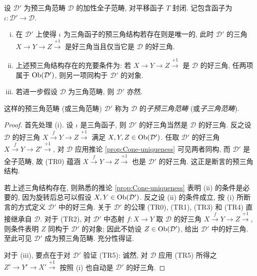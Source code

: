 \begin{definition-proposition}[子预三角范畴]\label{def:triangulated-subcat}
	设 $\mathcal{D}'$ 为预三角范畴 $\mathcal{D}$ 的加性全子范畴, 对平移函子 $T$ 封闭. 记包含函子为 $\iota: \mathcal{D}' \to \mathcal{D}$.
	\begin{enumerate}[(i)]
		\item 在 $\mathcal{D}'$ 上使得 $\iota$ 为三角函子的预三角结构若存在则是唯一的, 此时 $\mathcal{D}'$ 的三角 $X \to Y \to Z \xrightarrow{+1}$ 是好三角当且仅当它是 $\mathcal{D}$ 的好三角.
		\item 上述预三角结构存在的充要条件为: 若 $X \to Y \to Z \xrightarrow{+1}$ 是 $\mathcal{D}$ 的好三角, 任两项属于 $\operatorname{Ob}(\mathcal{D}')$, 则另一项同构于 $\mathcal{D}'$ 的对象.
		\item 若进一步假设 $\mathcal{D}$ 为三角范畴, 则 $\mathcal{D}'$ 亦然.
	\end{enumerate}

	这样的预三角范畴 (或三角范畴) $\mathcal{D}'$ 称为 $\mathcal{D}$ 的\emph{子预三角范畴} (或\emph{子三角范畴}).
\end{definition-proposition}
\begin{proof}
	首先处理 (i). 设 $\iota$ 是三角函子, 则 $\mathcal{D}'$ 的好三角当然是 $\mathcal{D}$ 的好三角. 反之设 $\mathcal{D}$ 的好三角 $X \xrightarrow{f} Y \to Z \xrightarrow{+1}$ 满足 $X, Y, Z \in \operatorname{Ob}(\mathcal{D}')$. 任取 $\mathcal{D}'$ 的好三角 $X \xrightarrow{f} Y \to Z' \xrightarrow{+1}$, 对 $\mathcal{D}$ 应用推论 \ref{prop:Cone-uniqueness} 可见两者同构, 而 $\mathcal{D}'$ 是全子范畴, 故 (TR0) 蕴涵 $X \xrightarrow{f} Y \to Z \xrightarrow{+1}$ 也是 $\mathcal{D}'$ 的好三角. 这正是断言的预三角结构.
	
	若上述三角结构存在, 则熟悉的推论 \ref{prop:Cone-uniqueness} 表明 (ii) 的条件是必要的, 因为旋转后总可以假设 $X, Y \in \operatorname{Ob}(\mathcal{D}')$. 反之设 (ii) 的条件成立, 按 (i) 所断言的方式定义 $\mathcal{D}'$ 中的好三角. 关于 $\mathcal{D}'$ 的公理 (TR0), (TR1), (TR3) 和 (TR4) 直接继承自 $\mathcal{D}$. 对于 (TR2), 对 $\mathcal{D}'$ 中态射 $f: X \to Y$ 取 $\mathcal{D}$ 的好三角 $X \xrightarrow{f} Y \to Z \xrightarrow{+1}$, 则条件表明 $Z$ 同构于 $\mathcal{D}'$ 的对象; 因此不妨设 $Z \in \operatorname{Ob}(\mathcal{D}')$, 给出 $\mathcal{D}'$ 中的好三角. 至此可见 $\mathcal{D}'$ 成为预三角范畴. 充分性得证.

	对于 (iii), 要点在于对 $\mathcal{D}'$ 验证 (TR5): 诚然, 对 $\mathcal{D}$ 应用 (TR5) 所得之 $Z' \to Y' \to X' \xrightarrow{+1}$ 按照 (i) 也自动是 $\mathcal{D}'$ 的好三角.
\end{proof}

